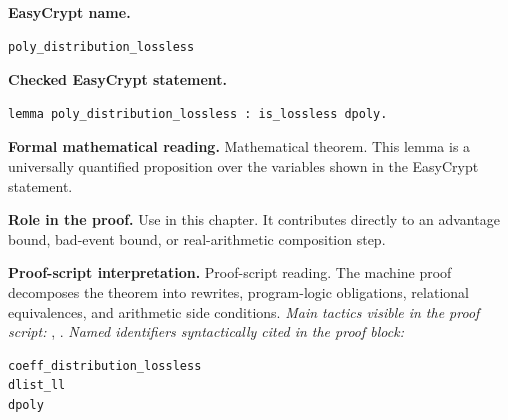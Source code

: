 \begin{formaltheorem}
\noindent\textbf{EasyCrypt name.}
\begin{lstlisting}[language=EasyCrypt,basicstyle=\ttfamily\scriptsize]
poly_distribution_lossless
\end{lstlisting}
\noindent\textbf{Checked EasyCrypt statement.}
\begin{lstlisting}[language=EasyCrypt,basicstyle=\ttfamily\scriptsize]
lemma poly_distribution_lossless : is_lossless dpoly.
\end{lstlisting}
\noindent\textbf{Formal mathematical reading.}
Mathematical theorem. This lemma is a universally quantified proposition over the variables shown in the EasyCrypt statement.

\noindent\textbf{Role in the proof.}
Use in this chapter. It contributes directly to an advantage bound, bad-event bound, or real-arithmetic composition step.

\noindent\textbf{Proof-script interpretation.}
Proof-script reading. The machine proof decomposes the theorem into rewrites, program-logic obligations, relational equivalences, and arithmetic side conditions.
\emph{Main tactics visible in the proof script:} , .
\emph{Named identifiers syntactically cited in the proof block:}
\begin{lstlisting}[language=EasyCrypt,basicstyle=\ttfamily\scriptsize]
coeff_distribution_lossless
dlist_ll
dpoly
\end{lstlisting}

\end{formaltheorem}

